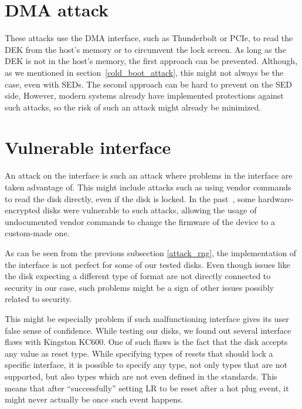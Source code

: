 \section{DMA attack}

These attacks use the DMA interface, such as Thunderbolt or PCIe, to read the DEK from the host's memory or to circumvent the lock screen. As long as the DEK is not in the host's memory, the first approach can be prevented. Although, as we mentioned in section~\ref{cold_boot_attack}, this might not always be the case, even with SEDs.
The second approach can be hard to prevent on the SED side, 
However, modern systems already have implemented protections against such attacks, so the risk of such an attack might already be minimized.


\section{Vulnerable interface}

An attack on the interface is such an attack where problems in the interface are taken advantage of.
This might include attacks such as using vendor commands to read the disk directly, even if the disk is locked. In the past~\cite{self_encrypting_deception}, some hardware-encrypted disks were vulnerable to such attacks, allowing the usage of undocumented vendor commands to change the firmware of the device to a custom-made one. %

As can be seen from the previous subsection \ref{attack_rng}, the implementation of the interface is not perfect for some of our tested disks. Even though issues like the disk expecting a different type of format are not directly connected to security in our case, such problems might be a sign of other issues possibly related to security.

This might be especially problem if such malfunctioning interface gives its user false sense of confidence. While testing our disks, we found out several interface flaws with Kingston KC600. One of such flaws is the fact that the disk accepts any value as reset type. While specifying types of resets that should lock a specific interface, it is possible to specify any type, not only types that are not supported, but also types which are not even defined in the standards. This means that after ``successfully'' setting LR to be reset after a hot plug event, it might never actually be once such event happens.

